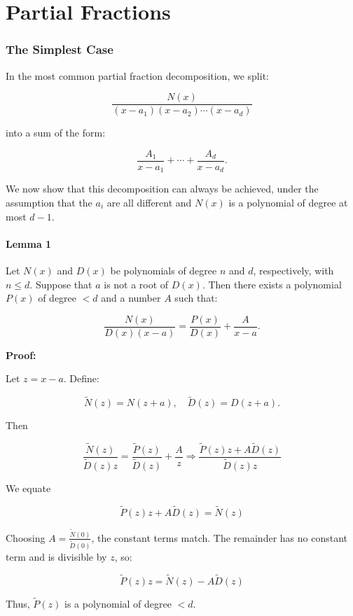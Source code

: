 
\chapter{Partial Fractions}

\subsection{The Simplest Case}

In the most common partial fraction decomposition, we split:

\[
    \frac{N(x)}{(x - a_1)(x - a_2)\cdots(x - a_d)}
\]

into a sum of the form:

\[
    \frac{A_1}{x - a_1} + \cdots + \frac{A_d}{x - a_d}.
\]

We now show that this decomposition can always be achieved, under the assumption that the \(a_i\) are 
all different and \(N(x)\) is a polynomial of degree at most \(d - 1\).

\subsubsection{Lemma 1}

Let \(N(x)\) and \(D(x)\) be polynomials of degree \(n\) and \(d\), respectively, with \(n \leq d\). 
Suppose that \(a\) is not a root of \(D(x)\). Then there exists a polynomial \(P(x)\) of degree \(< d\) 
and a number \(A\) such that:

\[
    \frac{N(x)}{D(x)(x - a)} = \frac{P(x)}{D(x)} + \frac{A}{x - a}.
\]

\textbf{Proof:} 

Let \(z = x - a\). Define:

\[
    \tilde{N}(z) = N(z + a), \quad \tilde{D}(z) = D(z + a).
\]

Then

\[
    \frac{\tilde{N}(z)}{\tilde{D}(z)z} = \frac{\tilde{P}(z)}{\tilde{D}(z)} + \frac{A}{z}
    \Rightarrow \frac{\tilde{P}(z)z + A\tilde{D}(z)}{\tilde{D}(z)z}
\]

We equate

\[
    \tilde{P}(z)z + A\tilde{D}(z) = \tilde{N}(z)
\]

Choosing \(A = \frac{\tilde{N}(0)}{\tilde{D}(0)}\), the constant terms match. The remainder has no 
constant term and is divisible by \(z\), so:

\[
    \tilde{P}(z)z = \tilde{N}(z) - A\tilde{D}(z)
\]

Thus, \(\tilde{P}(z)\) is a polynomial of degree \(< d\).

